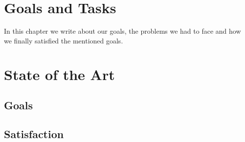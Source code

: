\section{Goals and Tasks}

In this chapter we write about our goals, the problems we had to face and how we finally satisfied the mentioned goals.

\section{State of the Art}

\subsection{Goals}

\subsection{Satisfaction}

